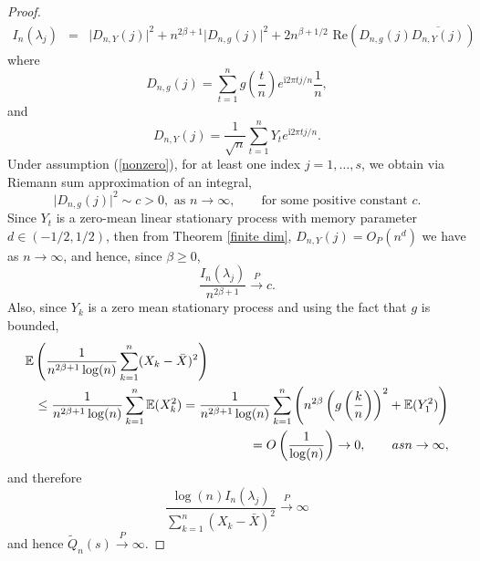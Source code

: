 \documentclass[10pt,a4paper]{amsart}
\numberwithin{equation}{section}
\def\i{\mathrm{i}}
\begin{document}
\begin{proof}
\begin{eqnarray}\label{decomp}
I_n(\lambda_j)&=&\vert D_{n,Y}(j)\vert^2+n^{2\beta+1}\vert D_{n,g}(j)\vert^2
+2n^{\beta+1/2}\,\,\textrm{Re}\left(D_{n,g}(j)\overline{D_{n,Y}(j)}\right)
\end{eqnarray}
where
$$
D_{n,g}(j)=\sum_{t=1}^ng\left(\frac{t}{n}\right)e^{\i 2\pi t j/n}\frac{1}{n},
$$
and
$$
D_{n,Y}(j)=\frac{1}{\sqrt{ n}}\sum_{t=1}^nY_te^{\i 2\pi t j/n}.
$$
Under assumption (\ref{nonzero}), for at least one index $j=1,\ldots,s$, we obtain via  Riemann sum approximation of an integral,
$$
\vert D_{n,g}(j)\vert^2\sim c>0, \textrm{ as }n\to\infty,\qquad\textrm{for some positive constant }c.
$$
Since $Y_t$ is a zero-mean linear stationary process with memory parameter $d\in(-1/2,1/2)$, then from Theorem \ref{finite dim}, $D_{n,Y}(j)=O_P(n^d)$ we have as $n\to\infty$, and hence, since $\beta\ge0$,
\begin{equation}\label{num1}
\frac{I_n(\lambda_j)}{ n^{2\beta+1}}\overset{P}{\to}c.
\end{equation}
Also, since $Y_k$ is a zero mean stationary process and using the fact that $g$ is bounded,
\begin{eqnarray*}\lefteqn{
\mathbb{E}\left(\frac{1}{n^{2\beta+1}\log(n)}\sum_{k=1}^n(X_k-\bar X)^2\right)}\\
&&\le\frac{1}{n^{2\beta+1}\log(n)}\sum_{k=1}^n\mathbb{E}(X_k^2)=\frac{1}{n^{2\beta+1}\log(n)}\sum_{k=1}^n\left(n^{2\beta}\left(g\left(\frac{k}{n}\right)\right)^2+\mathbb{E}(Y_1^2)\right)\\ 
&&=O\left(\frac{1}{\log(n)}\right)\to0,\qquad\textrm{as }n\to\infty,
\end{eqnarray*}
and therefore
$$
\frac{\log(n)I_n(\lambda_j)}{\sum_{k=1}^n(X_k-\bar X)^2}\overset{P}{\to}\infty
$$
and hence $\tilde Q_n(s)\overset{P}{\to}\infty.$
\end{proof}
\end{document}
